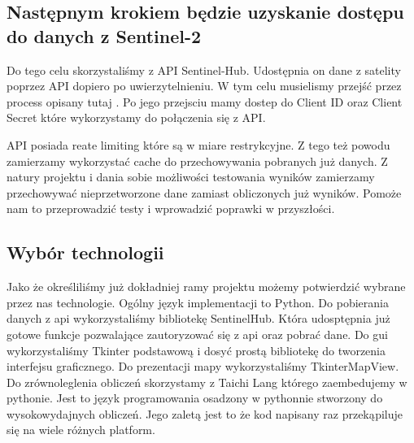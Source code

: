 \documentclass[12pt,a4paper]{article}
\begin{document}
\subsection{Następnym krokiem będzie uzyskanie dostępu do danych z Sentinel-2}

Do tego celu skorzystaliśmy z API Sentinel-Hub. \cite{sentinel2_api_docs} 
Udostępnia on dane z satelity poprzez API dopiero po uwierzytelnieniu. 
W tym celu musielismy przejść przez process opisany tutaj \cite{sentinel2_api_docs_auth}.
Po jego przejsciu mamy dostep do Client ID oraz Client Secret które wykorzystamy do połączenia się z API.

API posiada reate limiting które są w miare restrykcyjne. \cite{sentinel2_api_auth_rate_limiting}
Z tego też powodu zamierzamy wykorzystać cache do przechowywania pobranych już danych.
Z natury projektu i dania sobie możliwości testowania wyników zamierzamy przechowywać nieprzetworzone dane zamiast obliczonych już wyników.
Pomoże nam to przeprowadzić testy i wprowadzić poprawki w przyszłości.

\subsection{Wybór technologii}

Jako że określiliśmy już dokładniej ramy projektu możemy potwierdzić wybrane przez nas technologie. 
Ogólny język implementacji to Python.
Do pobierania danych z api wykorzystaliśmy bibliotekę SentinelHub. Która udosptępnia już gotowe funkcje pozwalające zautoryzować się z api oraz pobrać dane.
Do gui wykorzystaliśmy Tkinter podstawową i dosyć prostą bibliotekę do tworzenia interfejsu graficznego.
Do prezentacji mapy wykorzystaliśmy TkinterMapView.
Do zrównoleglenia obliczeń skorzystamy z Taichi Lang \cite{taichi_lang_docs} którego zaembedujemy w pythonie.
Jest to język programowania osadzony w pythonnie stworzony do wysokowydajnych obliczeń.
Jego zaletą jest to że kod napisany raz przekąpiluje się na wiele różnych platform.

\newpage
\end{document}
